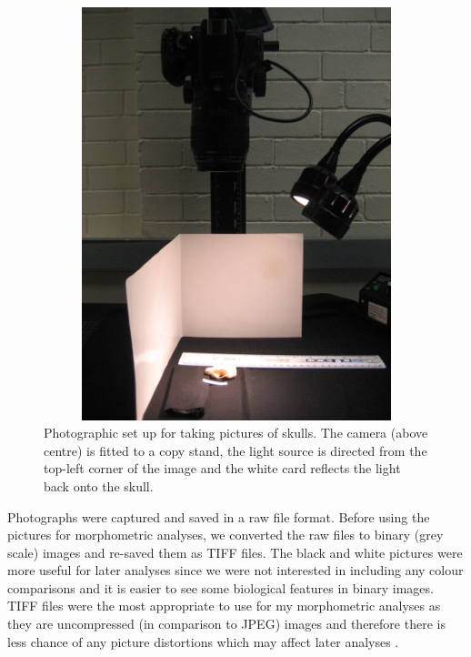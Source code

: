 \documentclass[12pt,a4paper]{article}
\begin{document}
	\begin{figure}[H] 
  	\centering
  	\includegraphics[width=12cm, height=12cm, keepaspectratio=true]{figures/camera.jpg}
    \caption[Photographic set up]%
    {Photographic set up for taking pictures of skulls. The camera (above centre) is fitted to a copy stand, the light source is directed from the top-left corner of the image and the white card reflects the light back onto the skull. }%
  	\label{fig:camera}
  	\end{figure}

Photographs were captured and saved in a raw file format. Before using the pictures for morphometric analyses, we converted the raw files to binary (grey scale) images and re-saved them as TIFF files. The black and white pictures were more useful for later analyses since we were not interested in including any colour comparisons and it is easier to see some biological features in binary images. TIFF files were the most appropriate to use for my morphometric analyses as they are uncompressed (in comparison to JPEG) images and therefore there is less chance of any picture distortions which may affect later analyses \citep{HERC2013}.
\end{document}
